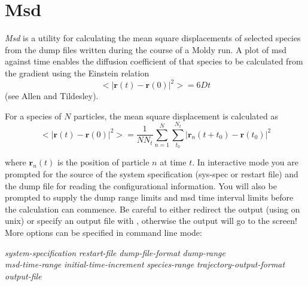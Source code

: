 \documentclass[a4paper,twoside]{report}
\providecommand{\bm}[1]{\mathbf{#1}}
\begin{document}
\section{Msd}%
\emph{Msd} is a utility for calculating the mean square displacements
of selected species from the dump files written during the course of a
Moldy run. A plot of msd against time enables the diffusion
coefficient of that species to be calculated from the gradient using
the Einstein relation
\begin{equation}
   <|\bm{r}(t)-\bm{r}(0)|^2> = 6 D t
\end{equation}
(see Allen and Tildesley\cite[p60]{allen:87}).

For a species of $N$ particles, the mean square displacement is
calculated as
\begin{equation}  
        <|\bm{r}(t)-\bm{r}(0)|^2> = \frac{1}{N N_t}
        \sum_{n=1}^{N} \sum_{t_0}^{N_t}
        |\bm{r}_n(t+t_0) - \bm{r}(t_0)|^2
\end{equation}

where $\bm{r}_n(t)$ is the position of particle $n$ at
time $t$.  In interactive mode you are prompted for the source of the
system specification (sys-spec or restart file) and the dump file for
reading the configurational information. You will also be prompted to
supply the dump range limits and msd time interval limits before the
calculation can commence. Be careful to either redirect the output
(using \Lit{>} on unix) or specify an output file with ,
otherwise the output will go to the screen!  More options can be
specified in command line mode:

\begin{center}
\Lit{[-s} \textit{system-specification} \Lit{]|}%
\Lit{[-r} \textit{restart-file} \Lit{]}
\Lit{[-d} \textit{dump-file-format} \Lit{]}
\Lit{[-t} \textit{dump-range} \Lit{]} \\

\Lit{[-m} \textit{msd-time-range} \Lit{]}
\Lit{[-i} \textit{initial-time-increment} \Lit{]}
\Lit{[-g} \textit{species-range} \Lit{]}
\Lit{[-u]}
\Lit{[-w} \textit{trajectory-output-format} \Lit{]}
\Lit{[-x|-X]} \Lit{[-y|-Y]} \Lit{[-z|-Z]}
\Lit{[-o} \textit{output-file} \Lit{]}
\end{center}
\end{document}
